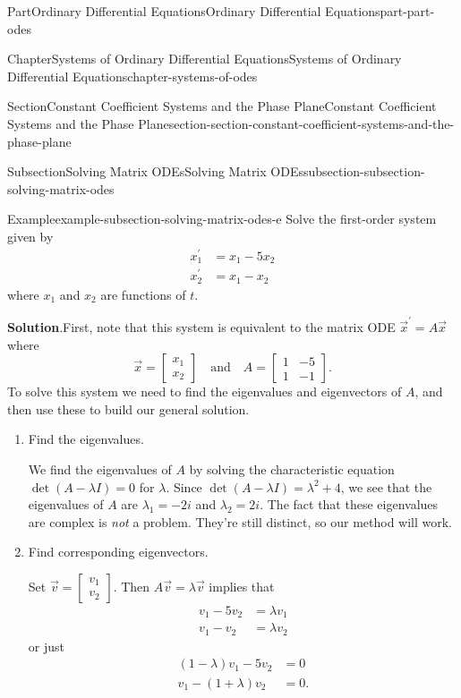 \documentclass[twoside,10pt,]{book}
\newcommand{\blocktitlefont}{\relax}
\numberwithin{equation}{part}
\newcommand{\qq}[1]{\quad\text{#1}\quad}
\begin{document}
\begin{partptx}{Part}{Ordinary Differential Equations}{}{Ordinary Differential Equations}{}{}{part-part-odes}
\begin{chapterptx}{Chapter}{Systems of Ordinary Differential Equations}{}{Systems of Ordinary Differential Equations}{}{}{chapter-systems-of-odes}
\begin{sectionptx}{Section}{Constant Coefficient Systems and the Phase Plane}{}{Constant Coefficient Systems and the Phase Plane}{}{}{section-section-constant-coefficient-systems-and-the-phase-plane}
\begin{subsectionptx}{Subsection}{Solving Matrix ODEs}{}{Solving Matrix ODEs}{}{}{subsection-subsection-solving-matrix-odes}
\begin{example}{Example}{}{example-subsection-solving-matrix-odes-e}
Solve the first-order system given by%
\begin{align*}
x_{1}^\prime & = x_{1} - 5x_{2}\\
x_{2}^\prime & = x_{1} - x_{2}
\end{align*}
where \(x_{1}\) and \(x_{2}\) are functions of \(t\).%
\par\smallskip%
\noindent\textbf{\blocktitlefont Solution}.\hypertarget{solution-subsection-solving-matrix-odes-e-b}{}\quad{}First, note that this system is equivalent to the matrix ODE \(\vec{x}^\prime = A\vec{x}\) where%
\begin{equation*}
\vec{x} = \begin{bmatrix}x_{1} \\ x_{2}\end{bmatrix}\qq{and} A = \begin{bmatrix}1 &  -5 \\ 1 &  -1\end{bmatrix}.
\end{equation*}
To solve this system we need to find the eigenvalues and eigenvectors of \(A\), and then use these to build our general solution.%
\begin{enumerate}
\item{}Find the eigenvalues.%
\par
We find the eigenvalues of \(A\) by solving the characteristic equation \(\det(A - \lambda I) = 0\) for \(\lambda\). Since \(\det(A - \lambda I) = \lambda^{2}+4\), we see that the eigenvalues of \(A\) are \(\lambda_{1} = -2i\) and \(\lambda_{2} = 2i\). The fact that these eigenvalues are complex is \emph{not} a problem. They're still distinct, so our method will work.%
\item{}Find corresponding eigenvectors.%
\par
Set \(\vec{v} = \begin{bmatrix}v_{1} \\ v_{2}\end{bmatrix}\). Then \(A\vec{v} = \lambda\vec{v}\) implies that%
\begin{align*}
v_{1} - 5v_{2}  & =  \lambda v_{1}\\
v_{1} -v_{2}  & =  \lambda v_{2}
\end{align*}
or just%
\begin{align*}
(1-\lambda)v_{1} - 5v_{2} & =0\\
v_{1} - (1+\lambda)v_{2} & = 0.
\end{align*}

\end{enumerate}
\end{example}
\end{subsectionptx}
\end{sectionptx}
\end{chapterptx}
\end{partptx}
\end{document}
